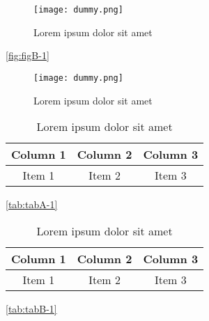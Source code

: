 \begin{figure}[H]
    \centering
    \texttt{[image: dummy.png]}
    \caption{Lorem ipsum dolor sit amet}
    \label{fig:figA-3}
\end{figure}

\lipsum[1-1] \ref{fig:figB-1}

\begin{figure}[H]
    \centering
    \texttt{[image: dummy.png]}
    \caption{Lorem ipsum dolor sit amet}
    \label{fig:figB-3}
\end{figure}


\lipsum[1-1] \cite{reference-1}


\lipsum[1-1] \cite{reference-2}


\lipsum[1-1] \cite{reference-3}


\begin{table}[ht!]
    \centering
    \begin{tabular}{c c c}
        \hline
        Column 1 & Column 2 & Column 3 \\
        \hline
        Item 1   & Item 2   & Item 3   \\
    \end{tabular}
    \caption{Lorem ipsum dolor sit amet}
    \label{tab:tabA-3}
\end{table}

\lipsum[1-1] \ref{tab:tabA-1}

\begin{table}[ht!]
    \centering
    \begin{tabular}{c c c}
        \hline
        Column 1 & Column 2 & Column 3 \\
        \hline
        Item 1   & Item 2   & Item 3   \\
    \end{tabular}
    \caption{Lorem ipsum dolor sit amet}
    \label{tab:tabB-3}
\end{table}

\lipsum[1-1] \ref{tab:tabB-1}

\lipsum[1-2]
